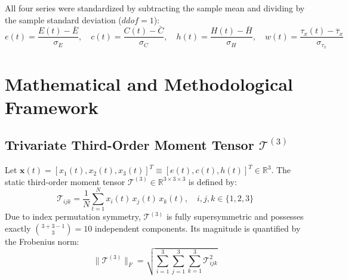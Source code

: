 \documentclass[11pt,a4paper]{article}
\begin{document}
All four series were standardized by subtracting the sample mean and dividing by the sample standard deviation ($ddof = 1$):
\begin{equation}
e(t) = \frac{E(t) - \bar{E}}{\sigma_E}, \quad c(t) = \frac{C(t) - \bar{C}}{\sigma_C}, \quad h(t) = \frac{H(t) - \bar{H}}{\sigma_H}, \quad w(t) = \frac{\tau_x(t) - \bar{\tau}_x}{\sigma_{\tau_x}}
\end{equation}

\section{Mathematical and Methodological Framework}

\subsection{Trivariate Third-Order Moment Tensor $\mathcal{T}^{(3)}$}
Let $\mathbf{x}(t) = [x_1(t), x_2(t), x_3(t)]^T \equiv [e(t), c(t), h(t)]^T \in \mathbb{R}^3$. The static third-order moment tensor $\mathcal{T}^{(3)} \in \mathbb{R}^{3 \times 3 \times 3}$ is defined by:
\begin{equation}
\mathcal{T}_{ijk} = \frac{1}{N} \sum_{t=1}^N x_i(t) \, x_j(t) \, x_k(t), \quad i,j,k \in \{1, 2, 3\}
\end{equation}
Due to index permutation symmetry, $\mathcal{T}^{(3)}$ is fully supersymmetric and possesses exactly $\binom{3+3-1}{3} = 10$ independent components. Its magnitude is quantified by the Frobenius norm:
\begin{equation}
\|\mathcal{T}^{(3)}\|_F = \sqrt{\sum_{i=1}^3 \sum_{j=1}^3 \sum_{k=1}^3 \mathcal{T}_{ijk}^2}
\end{equation}
\end{document}
